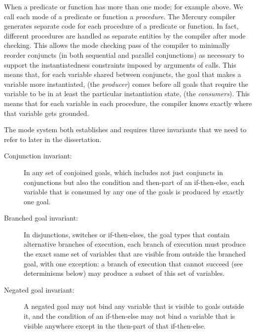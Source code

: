 When a predicate or function has more than one mode;
for example  above.
We call each mode of a predicate or function a \emph{procedure}.
The Mercury compiler generates separate code
for each procedure of a predicate or function.
In fact, different procedures are handled as separate entities by
the compiler after mode checking.
This allows the mode checking pass of the compiler to minimally
reorder conjuncts (in both sequential and parallel conjunctions)
as necessary to support the instantiatedness constraints imposed by arguments
of calls.
This means that,
for each variable shared between conjuncts,
the goal that makes a variable more instantiated,
(the \emph{producer})
comes before all goals that require the variable to be in at least
the particular instantiation state, (the \emph{consumers}).
This means that for each variable in each procedure,
the compiler knows exactly where that variable gets grounded.

The mode system both establishes and requires three invariants
that we need to refer to later in the dissertation.

\begin{description}

  \item[Conjunction invariant:]
  In any set of conjoined goals,
  which includes not just conjuncts in conjunctions
  but also the condition and then-part of an if-then-else,
  each variable that is consumed by any one of the goals
  is produced by exactly one goal.
  
  \item[Branched goal invariant:]
  In disjunctions, switches or if-then-elses,
  the goal types that contain alternative branches of execution,
  each branch of execution must produce
  the exact same set of variables
  that are visible from outside the branched goal,
  with one exception:
  a branch of execution that cannot succeed (see determinisms below)
  may produce a subset of this set of variables.
  
  \item[Negated goal invariant:]
  A negated goal may not bind
  any variable that is visible to goals outside it,
  and the condition of an if-then-else may not bind a variable
  that is visible anywhere except in
  the then-part of that if-then-else.

\end{description}

